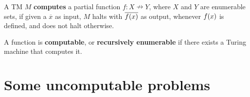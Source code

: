 \begin{definition} A TM $M$ \textbf{computes} a partial function
$f:X\nrightarrow Y$, where $X$ and $Y$ are enumerable sets, if given a
$\overline{x}$ as input, $M$ halts with $\overline{f\mathopen{}\left({x}\right)\mathclose{}}$ as output, whenever
$f\mathopen{}\left({x}\right)\mathclose{}$ is defined, and does not halt otherwise.  \end{definition}

\begin{definition} A function is \textbf{computable}, or \textbf{recursively
enumerable} if there exists a Turing machine that computes it. \end{definition}

\section{Some uncomputable problems}
